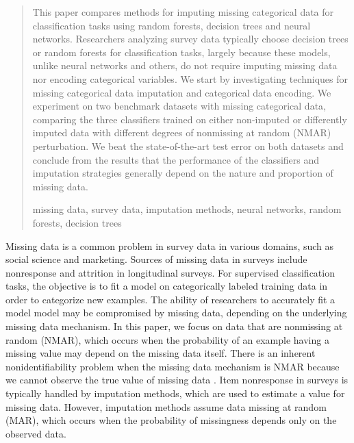 \documentclass[10pt]{book}
\theoremstyle{definition}
\begin{document}
\begin{quotation}
This paper compares methods for imputing missing categorical data for classification
tasks using random forests, decision trees and neural networks.
Researchers analyzing survey data typically choose decision trees or random
forests for classification tasks, largely because these models, unlike neural
networks and others, do not require imputing missing data nor encoding categorical
variables. We start by investigating techniques for missing categorical data imputation
and categorical data encoding. We experiment on two benchmark datasets with missing categorical data, comparing the three classifiers trained on either non-imputed or differently imputed data with different degrees of nonmissing at random (NMAR) perturbation. We beat the state-of-the-art test error on both datasets and conclude from the results that the performance of the classifiers and imputation strategies generally depend on the nature and proportion of missing data. \par

\vspace{9pt}
missing data, survey data, imputation methods,  neural networks, random forests, decision trees
\par
\end{quotation}\par



\def\thefigure{\arabic{figure}}
\def\thetable{\arabic{table}}

\fontsize{12}{14pt plus.8pt minus .6pt}\selectfont

\newpage %

\setcounter{chapter}{1}
\setcounter{equation}{0} %

Missing data is a common problem in survey data in various domains, such as social science and marketing. Sources of missing data in surveys include nonresponse and attrition in longitudinal surveys. For supervised classification tasks, the objective is to fit a model on categorically labeled training data in order to categorize new examples. The ability of researchers to accurately fit a model model may be compromised by missing data, depending on the underlying missing data mechanism. In this paper, we focus on data that are nonmissing at random (NMAR), which occurs when the probability of an example having a missing value may depend on the missing data itself. There is an inherent nonidentifiability problem when the missing data mechanism is NMAR because we cannot observe the true value of missing data \citep{tsiatis2007}. Item nonresponse in surveys is typically handled by imputation methods, which are used to estimate a value for missing data. However, imputation methods assume data missing at random (MAR), which occurs when the probability of missingness depends only on the observed data. 
\end{document}
